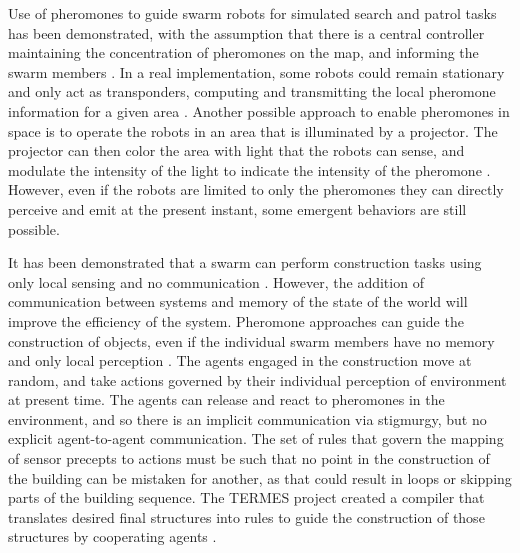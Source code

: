 Use of pheromones to guide swarm robots for simulated search and patrol tasks has been demonstrated, with the assumption that there is a central controller maintaining the concentration of pheromones on the map, and informing the swarm members \citep{coppin2012controlling}. 
In a real implementation, some robots could remain stationary and only act as transponders, computing and transmitting the local pheromone information for a given area \citep{hoff2010two}. 
Another possible approach to enable pheromones in space is to operate the robots in an area that is illuminated by a projector. 
The projector can then color the area with light that the robots can sense, and modulate the intensity of the light to indicate the intensity of the pheromone \citep{arvin2015cosvarphi,diaz2017human}. 
However, even if the robots are limited to only the pheromones they can directly perceive and emit at the present instant, some emergent behaviors are still possible. 


It has been demonstrated that a swarm can perform construction tasks using only local sensing and no communication \citep{wawerla2002collective, bowyer2000automated}.
However, the addition of communication between systems and memory of the state of the world will improve the efficiency of the system.
Pheromone approaches can guide the construction of objects, even if the individual swarm members have no memory and only local perception \citep{mason2003programming}. 
The agents engaged in the construction move at random, and take actions governed by their individual perception of environment at present time. 
The agents can release and react to pheromones in the environment, and so there is an implicit communication via stigmurgy, but no explicit agent-to-agent communication. 
The set of rules that govern the mapping of sensor precepts to actions must be such that no point in the construction of the building can be mistaken for another, as that could result in loops or skipping parts of the building sequence. 
The TERMES project created a compiler that translates desired final structures into rules to guide the construction of those structures by cooperating agents \citep{werfel2014designing}.

